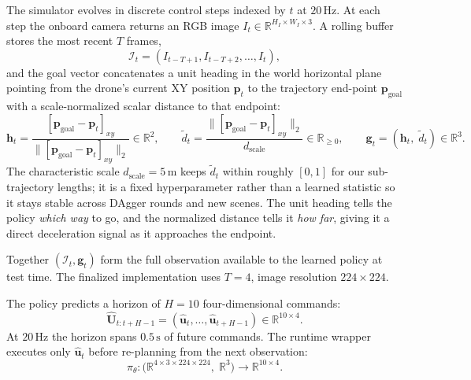\documentclass[10pt,twocolumn,letterpaper]{article}
\begin{document}
The simulator evolves in discrete control steps indexed by $t$ at $20\,\mathrm{Hz}$. At each step the onboard camera returns an RGB image $I_t \in \mathbb{R}^{H_I \times W_I \times 3}$. A rolling buffer stores the most recent $T$ frames,
\begin{equation}
\label{eq:obs}
\mathcal{I}_t = (I_{t-T+1}, I_{t-T+2}, \ldots, I_t),
\end{equation}
and the goal vector concatenates a unit heading in the world horizontal plane pointing from the drone's current XY position $\mathbf{p}_t$ to the trajectory end-point $\mathbf{p}_{\mathrm{goal}}$ with a scale-normalized scalar distance to that endpoint:
\begin{equation}
\label{eq:goalheading}
\mathbf{h}_t = \frac{[\mathbf{p}_{\mathrm{goal}} - \mathbf{p}_t]_{xy}}
                    {\|[\mathbf{p}_{\mathrm{goal}} - \mathbf{p}_t]_{xy}\|_2} \in \mathbb{R}^2,
\qquad
\tilde{d}_t = \frac{\|[\mathbf{p}_{\mathrm{goal}} - \mathbf{p}_t]_{xy}\|_2}{d_{\mathrm{scale}}} \in \mathbb{R}_{\geq 0},
\qquad
\mathbf{g}_t = (\mathbf{h}_t,\; \tilde{d}_t) \in \mathbb{R}^3.
\end{equation}
The characteristic scale $d_{\mathrm{scale}}{=}5\,\mathrm{m}$ keeps $\tilde{d}_t$ within roughly $[0, 1]$ for our sub-trajectory lengths; it is a fixed hyperparameter rather than a learned statistic so it stays stable across DAgger rounds and new scenes. The unit heading tells the policy \emph{which way} to go, and the normalized distance tells it \emph{how far}, giving it a direct deceleration signal as it approaches the endpoint.

Together $(\mathcal{I}_t, \mathbf{g}_t)$ form the full observation available to the learned policy at test time. The finalized implementation uses $T{=}4$, image resolution $224\times224$.

The policy predicts a horizon of $H{=}10$ four-dimensional commands:
\begin{equation}
\label{eq:horizon}
\hat{\mathbf{U}}_{t:t+H-1} = (\hat{\mathbf{u}}_t, \ldots, \hat{\mathbf{u}}_{t+H-1}) \in \mathbb{R}^{10 \times 4}.
\end{equation}
At $20\,\mathrm{Hz}$ the horizon spans $0.5\,\mathrm{s}$ of future commands. The runtime wrapper executes only $\hat{\mathbf{u}}_t$ before re-planning from the next observation:
\begin{equation}
\label{eq:policy}
\pi_\theta : \bigl(\mathbb{R}^{4 \times 3 \times 224 \times 224},\; \mathbb{R}^3\bigr) \rightarrow \mathbb{R}^{10 \times 4}.
\end{equation}
\end{document}
